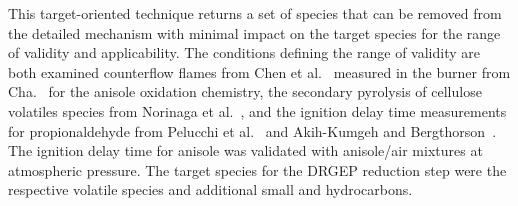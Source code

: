 \begin{refsection}
This target-oriented technique returns a set of species that can be removed from the detailed mechanism with minimal impact on the target species for the range of validity and applicability. The conditions defining the range of validity are both examined counterflow flames from Chen et al.~\cite{Chen2022} measured in the burner from Cha.~ for the anisole oxidation chemistry, the secondary pyrolysis of cellulose volatiles species from Norinaga et al.~\cite{Norinaga2013}, and the ignition delay time measurements for propionaldehyde from Pelucchi et al.~\cite{Pelucchi2015} and Akih-Kumgeh and Bergthorson~\cite{AkihKumgeh2011}. The ignition delay time for anisole was validated with anisole/air mixtures at atmospheric pressure. The target species for the DRGEP reduction step were the respective volatile species and additional small  and  hydrocarbons.



\end{refsection}
